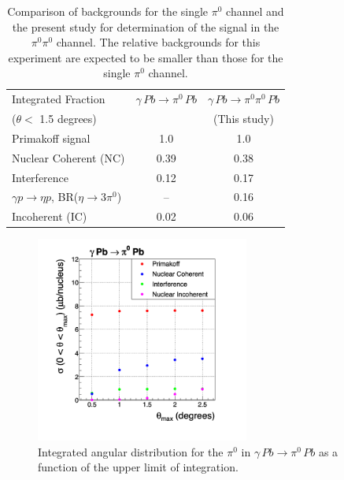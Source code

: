 \begin{table}[t]
\caption{Comparison of backgrounds for the single $\pi^0$ channel and the present study for 
determination of the signal in the $\pi^0\pi^0$ channel. The relative backgrounds for this experiment
are expected to be smaller than those for the single $\pi^0$ channel.
\label{tab:Primex_sigmas}
}
\begin{center}
\begin{tabular}{|l|c|c|}
\hline
\hline 
 Integrated Fraction & $\gamma\,Pb\to \pi^0\, Pb$  & $\gamma\,Pb\to \pi^0\pi^0\, Pb$ \\  
  ($\theta <$ 1.5 degrees)                    &       & (This study) \\  \hline
  Primakoff signal  &   1.0   & 1.0   \\ \hline 
  Nuclear Coherent (NC)  & 0.39  &   0.38   \\ \hline 
  Interference  & 0.12  &  0.17   \\ \hline 
  $\gamma p \rightarrow \eta p$, BR($\eta \rightarrow 3\pi^0$)  &   -- & 0.16   \\ \hline 
  Incoherent (IC)  &   0.02  & 0.06  \\
  \hline   
  \hline
\end{tabular}
\end{center}
\end{table}





\begin{figure}[tbp]
\begin{center}
\includegraphics[width=7cm,angle=0]{figures/Primex_sigmas_c1.png}
\end{center}
\caption{Integrated angular distribution for the $\pi^0$ in $\gamma\,Pb\rightarrow\pi^0\,Pb$ as a function of the upper limit of integration.}
\label{fig:Primex_sigmas_c1}
\end{figure}


